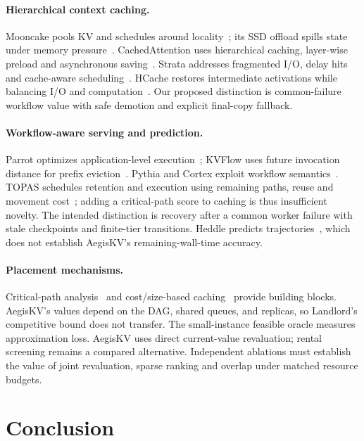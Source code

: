 \documentclass[sigplan,10pt,anonymous,nonacm]{acmart}
\begin{document}
\paragraph{Hierarchical context caching.}
Mooncake pools KV and schedules around locality~\cite{qin2025mooncake};
its SSD offload spills state under memory pressure~\cite{mooncake2026ssdoffload}.
CachedAttention uses hierarchical caching, layer-wise preload and
asynchronous saving~\cite{gao2024cachedattention}. Strata addresses
fragmented I/O, delay hits and cache-aware scheduling~\cite{xie2026strata}.
HCache restores intermediate activations while balancing I/O and
computation~\cite{gao2025hcache}. Our proposed distinction is common-failure workflow value
with safe demotion and explicit final-copy fallback.

\paragraph{Workflow-aware serving and prediction.}
Parrot optimizes application-level execution~\cite{lin2024parrot}; KVFlow
uses future invocation distance for prefix eviction~\cite{pan2025kvflow}.
Pythia and Cortex exploit workflow semantics~\cite{yu2026pythia,pagonas2025cortex}.
TOPAS schedules retention and execution using remaining paths, reuse and
movement cost~\cite{ni2026topas}; adding a critical-path score to caching
is thus insufficient novelty. The intended distinction is recovery after
a common worker failure with stale checkpoints and finite-tier transitions.
Heddle predicts trajectories~\cite{zhang2026heddle}, which does not establish
AegisKV's remaining-wall-time accuracy.

\paragraph{Placement mechanisms.}
Critical-path analysis~\cite{kelley1959cpm} and cost/size-based caching~\cite{young2002landlord}
provide building blocks. AegisKV's values depend on the DAG, shared queues,
and replicas, so Landlord's competitive bound does not transfer. The
small-instance feasible oracle measures approximation loss. AegisKV uses
direct current-value revaluation; rental screening remains a compared
alternative. Independent ablations must establish the value of joint
revaluation, sparse ranking and overlap under matched resource budgets.

\section{Conclusion}
\label{sec:conclusion}
\end{document}
